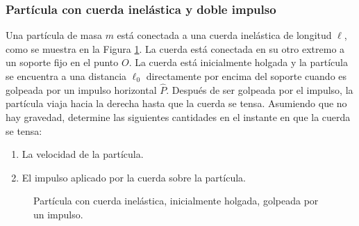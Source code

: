 \subsubsection{Partícula con cuerda inelástica y doble impulso}

Una partícula de masa $m$ está conectada a una cuerda inelástica de longitud $\ell$, como se muestra en la Figura \ref{fig:c2_e01_p24_cuerda_inelastica}. La cuerda está conectada en su otro extremo a un soporte fijo en el punto $O$. La cuerda está inicialmente holgada y la partícula se encuentra a una distancia $\ell_0$ directamente por encima del soporte cuando es golpeada por un impulso horizontal $\hat{P}$. Después de ser golpeada por el impulso, la partícula viaja hacia la derecha hasta que la cuerda se tensa. Asumiendo que no hay gravedad, determine las siguientes cantidades en el instante en que la cuerda se tensa:

\begin{enumerate}
    \item La velocidad de la partícula.
    \item El impulso aplicado por la cuerda sobre la partícula.
\end{enumerate}

\begin{figure}[!ht]
    \centering
    \caption{Partícula con cuerda inelástica, inicialmente holgada, golpeada por un impulso.}
    \label{fig:c2_e01_p24_cuerda_inelastica}
\end{figure}

